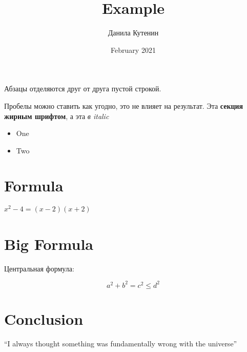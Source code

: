 \documentclass{article}
\title{Example}
\author{Данила Кутенин}
\date{February 2021}
\begin{document}
\maketitle

Абзацы отделяются друг от друга
пустой строкой.

Пробелы можно ставить как угодно,
это не влияет на результат. Эта {\bf секция жирным шрифтом}, а эта {\it в italic}

\begin{itemize}
  \item One
  \item Two
\end{itemize}

\section{Formula}
$x^2 - 4 = (x - 2)(x + 2)$

\section{Big Formula}
Центральная формула:

$$
a^2 + b^2 = c^2 \leq d^2
$$

\section{Conclusion}
``I always thought something was fundamentally wrong with the universe'' \citep{adams1995hitchhiker}



\end{document}
